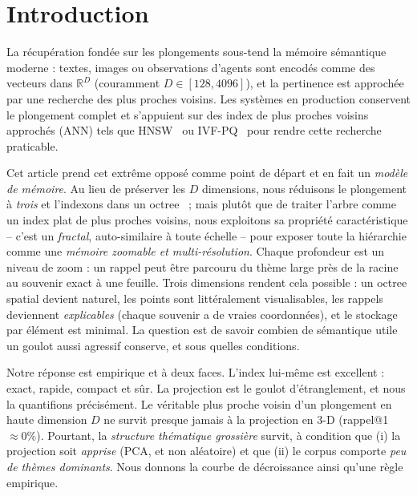 \documentclass[11pt]{article}
\begin{document}
\begin{abstract}
comme un index global unique, cette cascade récupère la cible sur des données réelles
de code d'agent avec un taux de succès de $99\%$ et ${\sim}26$ tokens par tour
(${\sim}137\times$ de moins qu'en injectant tout), là où l'index 3-D \emph{global}
d'OctaSoma seul obtient $0\%$ -- le routeur grossier n'est décisif qu'en tant que
brique de l'ensemble. Notre contribution est le modèle de mémoire multi-résolution
et explicable, son déploiement comme une fonction d'une pyramide d'inférence, ainsi
qu'une caractérisation honnête de sa plage de fonctionnement, livrés comme un
artefact propre et reproductible -- et non le pipeline de projection sous-jacent, que
nous attribuons aux travaux antérieurs~\cite{octreerag}.
\end{abstract}

\section{Introduction}
La récupération fondée sur les plongements sous-tend la mémoire sémantique moderne :
textes, images ou observations d'agents sont encodés comme des vecteurs dans
$\mathbb{R}^D$ (couramment $D\in[128,4096]$), et la pertinence est approchée par une
recherche des plus proches voisins. Les systèmes en production conservent le
plongement complet et s'appuient sur des index de plus proches voisins approchés
(ANN) tels que HNSW~\cite{hnsw} ou IVF-PQ~\cite{ivfpq,faiss} pour rendre cette
recherche praticable.

Cet article prend cet extrême opposé comme point de départ et en fait un \emph{modèle
de mémoire}. Au lieu de préserver les $D$ dimensions, nous réduisons le plongement à
\emph{trois} et l'indexons dans un octree~\cite{octreerag} ; mais plutôt que de
traiter l'arbre comme un index plat de plus proches voisins, nous exploitons sa
propriété caractéristique -- c'est un \emph{fractal}, auto-similaire à toute échelle
-- pour exposer toute la hiérarchie comme une \emph{mémoire zoomable et
multi-résolution}. Chaque profondeur est un niveau de zoom : un rappel peut être
parcouru du thème large près de la racine au souvenir exact à une feuille. Trois
dimensions rendent cela possible : un octree spatial devient naturel, les points sont
littéralement visualisables, les rappels deviennent \emph{explicables} (chaque
souvenir a de vraies coordonnées), et le stockage par élément est minimal. La
question est de savoir combien de sémantique utile un goulot aussi agressif conserve,
et sous quelles conditions.

Notre réponse est empirique et à deux faces. L'index lui-même est excellent : exact,
rapide, compact et sûr. La projection est le goulot d'étranglement, et nous la
quantifions précisément. Le véritable plus proche voisin d'un plongement en haute
dimension $D$ ne survit presque jamais à la projection en 3-D (rappel@1
$\approx 0\%$). Pourtant, la \emph{structure thématique grossière} survit, à condition
que (i) la projection soit \emph{apprise} (PCA, et non aléatoire) et que (ii) le
corpus comporte \emph{peu de thèmes dominants}. Nous donnons la courbe de
décroissance ainsi qu'une règle empirique.
\end{document}
